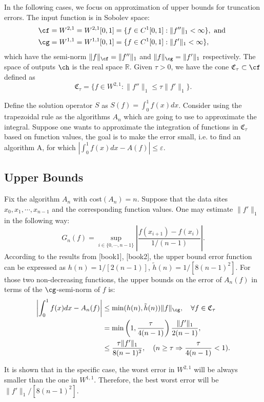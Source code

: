 \newcommand{\R}{\mathbb{R}}

In the following cases, we focus on approximation of upper bounds for truncation errors. The input function is in Sobolev space:
\begin{align*}
  \cf&=W^{2,1}=W^{2,1}[0,1]=\{f\in C^1[0,1]: \|f''\|_1<\infty\}, \text{ and }\\
  \cg&=W^{1,1}=W^{1,1}[0,1]=\{f\in C^1[0,1]: \|f'\|_1<\infty\},
\end{align*}
which have the semi-norm $\|f\|_{\cf}=\|f''\|_{1}$ and $\|f\|_{\cg}=\|f'\|_{1}$ respectively. The space of outputs $\ch$ is the real space $\R$. Given $\tau > 0$, we have the cone $\mathfrak{C}_{\tau} \subset \cf$ defined as $$\mathfrak{C}_{\tau}=\{f\in W^{2,1}:\|f''\|_1\leq\tau\|f'\|_1\}.$$

Define the solution operator $S$ as $S(f)=\int_{0}^{1}f(x)dx$. Consider using the trapezoidal rule as the algorithms $A_n$ which are going to use to approximate the integral. Suppose one wants to approximate the integration of functions in $\mathfrak{C}_{\tau}$ based on function values, the goal is to make the error small, i.e. to find an algorithm A, for which $|\int_{0}^{1}f(x)dx-A(f)|\leq \varepsilon$.

\subsection{Upper Bounds}
 Fix the algorithm $A_n$ with cost$(A_n)=n$. Suppose that the data sites $x_0,x_1,\cdots, x_{n-1}$ and the corresponding function values. One may estimate $\|f'\|_1$ in the following way: $$G_n(f)=\sup_{i\in\{0,\cdots,n-1\}}\left|\frac{f(x_{i+1})-f(x_{i})}{1/(n-1)}\right|.$$ According to the results from [book1], [book2], the upper bound error function can be expressed as $h(n)=1/[2(n-1)]$, $\tilde{h}(n)=1/[8(n-1)^2]$. For those two non-decreasing functions, the upper bounds on the error of $A_n(f)$ in terms of the $\cg$-semi-norm of $f$ is:
\begin{align*}
  \left|\int_{0}^{1}f(x)dx-A_n(f)\right|& \leq \min(h(n),\tilde{h}(n))\|f\|_{\cg}, \quad \forall f \in \mathfrak{C}_{\tau}\\
  &= \min\left(1,\frac{\tau}{4(n-1)}\right)\frac{\|f'\|_{1}}{2(n-1)},\\
  &\leq \frac{\tau\|f'\|_{1}}{8(n-1)^2}, \quad (n\geq \tau \Rightarrow \frac{\tau}{4(n-1)}<1).
\end{align*}

It is shown that in the specific case, the worst error in $W^{2,1}$ will be always smaller than the one in $W^{1,1}$. Therefore, the best worst error will be $\|f'\|_1/[8(n-1)^2]$.

